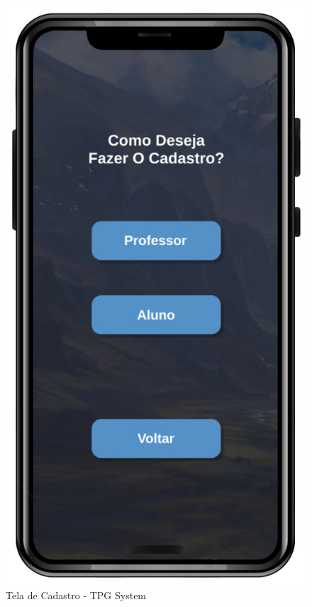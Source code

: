 \begin{figure}[!h]
\centering
\caption{Tela de Cadastro - TPG System}%
\label{fig:Tela2}
\includegraphics[scale=0.20]{Illustrations/Tela2.png}
\end{figure}


